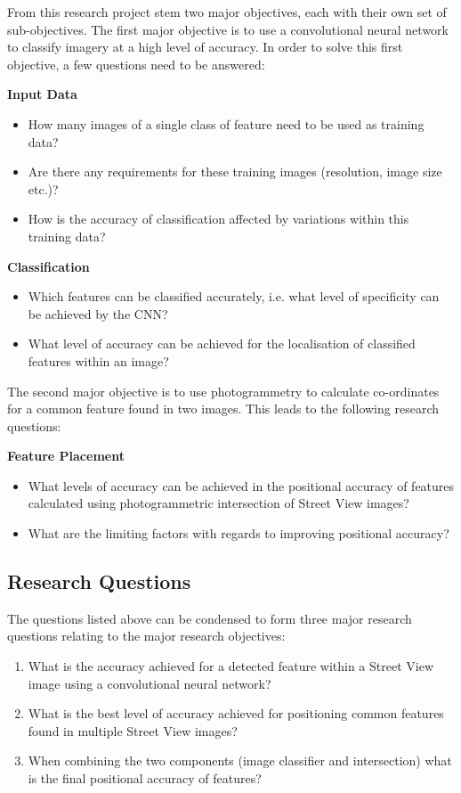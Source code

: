 From this research project stem two major objectives, each with their own set of sub-objectives. The first major objective is to use a convolutional neural network to classify imagery at a high level of accuracy. In order to solve this first objective, a few questions need to be answered:

\textbf{Input Data}
\begin{itemize}
\item How many images of a single class of feature need to be used as training data?
\item Are there any requirements for these training images (resolution, image size etc.)?
\item How is the accuracy of classification affected by variations within this training data?
\end{itemize}

\textbf{Classification}
\begin{itemize}
\item Which features can be classified accurately, i.e. what level of specificity can be achieved by the CNN?
\item What level of accuracy can be achieved for the localisation of classified features within an image?
\end{itemize}

The second major objective is to use photogrammetry to calculate co-ordinates for a common feature found in two images. This leads to the following research questions:

\textbf{Feature Placement}
\begin{itemize}
\item What levels of accuracy can be achieved in the positional accuracy of features calculated using photogrammetric intersection of Street View images?
\item What are the limiting factors with regards to improving positional accuracy?
\end{itemize}

\subsection{Research Questions}
The questions listed above can be condensed to form three major research questions relating to the major research objectives:

\begin{enumerate}
\item What is the accuracy achieved for a detected feature within a Street View image using a convolutional neural network?
\item What is the best level of accuracy achieved for positioning common features found in multiple Street View images?
\item When combining the two components (image classifier and intersection) what is the final positional accuracy of features?
\end{enumerate}

